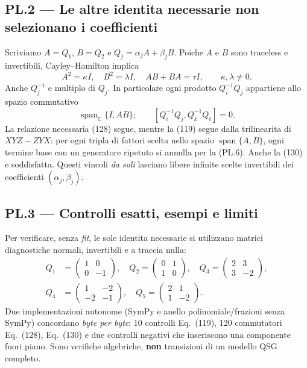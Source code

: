 \documentclass[11pt,a4paper]{article}
\begin{document}
\clearpage
\subsection*{PL.2 --- Le altre identita necessarie non selezionano i coefficienti}
Scriviamo $A=Q_1$, $B=Q_2$ e $Q_j=\alpha_j A+\beta_jB$. Poiche $A$ e $B$ sono traceless e invertibili, Cayley--Hamilton implica
\begin{equation}
 A^2=\kappa I,\quad B^2=\lambda I,\quad AB+BA=\tau I,\qquad
 \kappa,\lambda\ne0.\tag{PL.6}
\end{equation}
Anche $Q_j^{-1}$ e multiplo di $Q_j$. In particolare ogni prodotto $Q_i^{-1}Q_j$ appartiene allo spazio commutativo
\begin{equation}
 \operatorname{span}_{\mathbb C}\{I,AB\};\qquad
 [Q_i^{-1}Q_j,Q_k^{-1}Q_\ell]=0.\tag{PL.7}
\end{equation}
La relazione necessaria (128) segue, mentre la (119) segue dalla trilinearita di $XYZ-ZYX$: per ogni tripla di fattori scelta nello spazio $\operatorname{span}\{A,B\}$, ogni termine base con un generatore ripetuto si annulla per la (PL.6). Anche la (130) e soddisfatta. Questi vincoli \emph{da soli} lasciano libere infinite scelte invertibili dei coefficienti $(\alpha_j,\beta_j)$.

\subsection*{PL.3 --- Controlli esatti, esempi e limiti}
Per verificare, senza \emph{fit}, le sole identita necessarie si utilizzano matrici diagnostiche normali, invertibili e a traccia nulla:
\begin{equation}
\begin{split}
Q_1&=\begin{pmatrix}1&0\\0&-1\end{pmatrix},\quad
Q_2=\begin{pmatrix}0&1\\1&0\end{pmatrix},\quad
Q_3=\begin{pmatrix}2&3\\3&-2\end{pmatrix},\\
Q_4&=\begin{pmatrix}1&-2\\-2&-1\end{pmatrix},\quad
Q_5=\begin{pmatrix}2&1\\1&-2\end{pmatrix}.
\end{split}\tag{PL.8}
\end{equation}
Due implementazioni autonome (SymPy e anello polinomiale/frazioni senza SymPy) concordano \emph{byte per byte}: 10 controlli Eq.~(119), 120 commutatori Eq.~(128), Eq.~(130) e due controlli negativi che inseriscono una componente fuori piano. Sono verifiche algebriche, \textbf{non} transizioni di un modello QSG completo.
\end{document}
